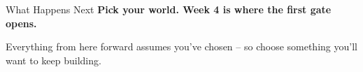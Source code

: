 \documentclass[aspectratio=169]{beamer}
\begin{document}
\begin{exitframe}{What Happens Next}
  \Large\color{cs2primary}
  \textbf{Pick your world. Week 4 is where the first gate opens.}

  \vspace{4mm}
  \normalsize\normalfont\color{cs2ink}
  Everything from here forward assumes you've chosen -- so choose
  something you'll want to keep building.
\end{exitframe}
\end{document}
